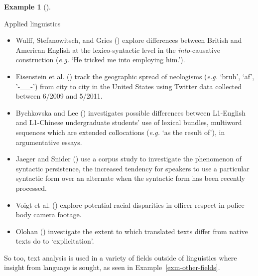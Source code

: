 \documentclass[
  letterpaper,
]{latex/krantz}
\providecommand{\tightlist}{%
  \setlength{\itemsep}{0pt}\setlength{\parskip}{0pt}}\usepackage{longtable,booktabs,array}
\theoremstyle{definition}
\newtheorem{example}{Example}[chapter]
\theoremstyle{remark}
\begin{document}
\begin{example}[]\protect\hypertarget{exm-linguistic-applied}{}\label{exm-linguistic-applied}

Applied linguistics

\begin{itemize}
\tightlist
\item
  Wulff, Stefanowitsch, and Gries ()
  explore differences between British and American English at the
  lexico-syntactic level in the \emph{into}-causative construction
  (\emph{e.g.} `He tricked me into employing him.').
\item
  Eisenstein et al. () track the
  geographic spread of neologisms (\emph{e.g.} `bruh', `af', '-\_\_-')
  from city to city in the United States using Twitter data collected
  between 6/2009 and 5/2011.
\item
  Bychkovska and Lee () investigates
  possible differences between L1-English and L1-Chinese undergraduate
  students' use of lexical bundles, multiword sequences which are
  extended collocations (\emph{e.g.} `as the result of'), in
  argumentative essays.
\item
  Jaeger and Snider () use a corpus study
  to investigate the phenomenon of syntactic persistence, the increased
  tendency for speakers to use a particular syntactic form over an
  alternate when the syntactic form has been recently processed.
\item
  Voigt et al. () explore potential racial
  disparities in officer respect in police body camera footage.
\item
  Olohan () investigate the extent to
  which translated texts differ from native texts do to `explicitation'.
\end{itemize}

\end{example}

So too, text analysis is used in a variety of fields outside of
linguistics where insight from language is sought, as seen in
Example~\ref{exm-other-fields}.
\end{document}

